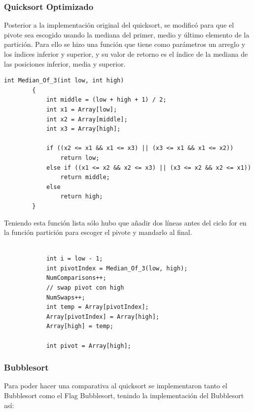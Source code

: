 \documentclass[conference]{IEEEtran}
\begin{document}
\subsubsection{Quicksort Optimizado}
Posterior a la implementación original del quicksort, se modificó para que el pivote sea escogido usando la mediana del primer, medio y último elemento de la partición.
Para ello se hizo una función que tiene como parámetros un arreglo y los índices inferior y superior, y su valor de retorno es el índice de la mediana de las posiciones inferior, media y superior.
\begin{verbatim}
int Median_Of_3(int low, int high)
        {
            int middle = (low + high + 1) / 2;
            int x1 = Array[low];
            int x2 = Array[middle];
            int x3 = Array[high];

            if ((x2 <= x1 && x1 <= x3) || (x3 <= x1 && x1 <= x2))
                return low;
            else if ((x1 <= x2 && x2 <= x3) || (x3 <= x2 && x2 <= x1))
                return middle;
            else
                return high;
        }
\end{verbatim}
Teniendo esta función lista sólo hubo que añadir dos líneas antes del ciclo for en la función partición para escoger el pivote y mandarlo al final.
\begin{verbatim}

            int i = low - 1;
            int pivotIndex = Median_Of_3(low, high);
            NumComparisons++;
            // swap pivot con high
            NumSwaps++;
            int temp = Array[pivotIndex];
            Array[pivotIndex] = Array[high];
            Array[high] = temp;

            int pivot = Array[high];
\end{verbatim}

\subsubsection{Bubblesort}
Para poder hacer una comparativa al quicksort se implementaron tanto el Bubblesort como el Flag Bubblesort, tenindo la implementación del Bubblesort así:
\end{document}

